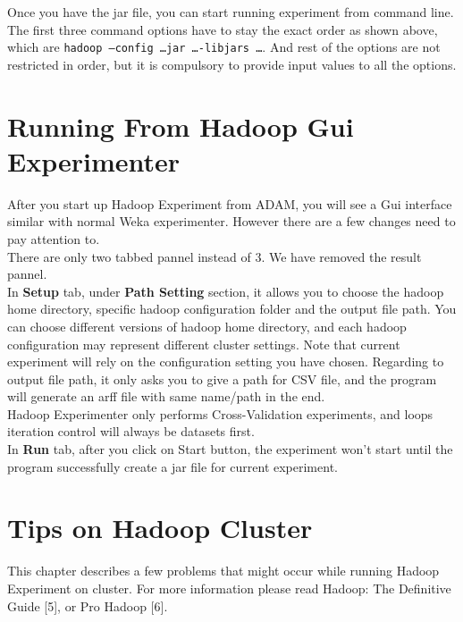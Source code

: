 \documentclass[a4paper]{book}
\begin{document}
\noindent Once you have the jar file, you can start running experiment from
command line. The first three command options have to stay the exact order as shown
above, which are \texttt{hadoop --config \ldots jar \ldots -libjars \ldots}. 
And rest of the options are not restricted in order, but it is compulsory 
to provide input values to all the options.

\chapter{Running From Hadoop Gui Experimenter}
\noindent After you start up Hadoop Experiment from ADAM, you will see a Gui
interface similar with normal Weka experimenter. However there are a few changes
need to pay attention to.\\

\noindent There are only two tabbed pannel instead of 3. We have removed the
result pannel.\\

\noindent In \textbf{Setup} tab, under \textbf{Path Setting} section, it allows
you to choose the hadoop home directory, specific hadoop configuration folder and the
output file path. You can choose different versions of hadoop home directory,
and each hadoop configuration may represent different cluster settings. Note that current
experiment will rely on the configuration setting you have chosen. Regarding
to output file path, it only asks you to give a path for CSV file, and
the program will generate an arff file with same name/path in the end.\\

\noindent Hadoop Experimenter only performs Cross-Validation experiments, and
loops iteration control will always be datasets first.\\

\noindent In \textbf{Run} tab, after you click on Start button, the
experiment won't start until the program successfully create a jar file for
current experiment.

\chapter{Tips on Hadoop Cluster}
This chapter describes a few problems that might occur while running Hadoop
Experiment on cluster. For more information please read Hadoop: The Definitive
Guide [5], or Pro Hadoop [6].

\end{document}
